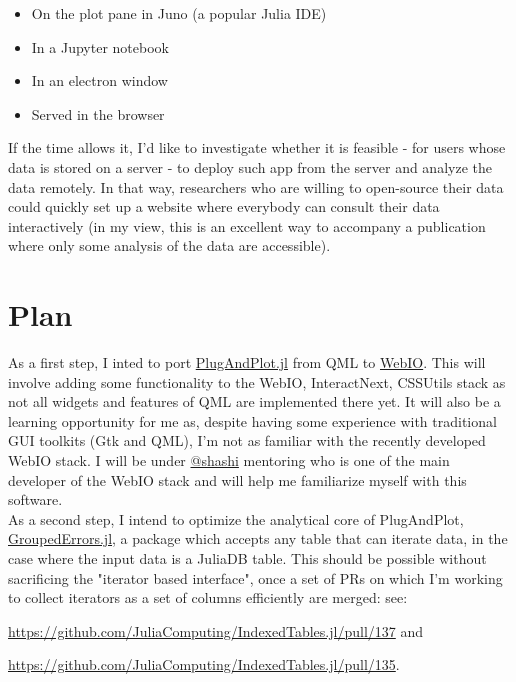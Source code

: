 \documentclass[10pt,a4paper]{report}
\begin{document}
\begin{itemize}
    \item On the plot pane in Juno (a popular Julia IDE)
    \item In a Jupyter notebook
    \item In an electron window
    \item Served in the browser
\end{itemize}

If the time allows it, I'd like to investigate whether it is feasible - for users whose data is stored on a server - to deploy such app from the server and analyze the data remotely. In that way, researchers who are willing to open-source their data could quickly set up a website where everybody can consult their data interactively (in my view, this is an excellent way to accompany a publication where only some analysis of the data are accessible).

\section*{Plan}

As a first step, I inted to port \href{https://github.com/piever/PlugAndPlot.jl}{PlugAndPlot.jl} from QML to \href{https://github.com/JuliaGizmos/WebIO.jl}{WebIO}. This will involve adding some functionality to the WebIO, InteractNext, CSSUtils stack as not all widgets and features of QML are implemented there yet. It will also be a learning opportunity for me as, despite having some experience with traditional GUI toolkits (Gtk and QML), I'm not as familiar with the recently developed WebIO stack. I will be under \href{https://github.com/shashi}{@shashi} mentoring who is one of the main developer of the WebIO stack and will help me familiarize myself with this software. \\

As a second step, I intend to optimize the analytical core of PlugAndPlot, \href{https://github.com/piever/GroupedErrors.jl}{GroupedErrors.jl}, a package which accepts any table that can iterate data, in the case where the input data is a JuliaDB table. This should be possible without sacrificing the "iterator based interface", once a set of PRs on which I'm working to collect iterators as a set of columns efficiently are merged: see:

 \url{https://github.com/JuliaComputing/IndexedTables.jl/pull/137} and

  \url{https://github.com/JuliaComputing/IndexedTables.jl/pull/135}.\\
\end{document}
